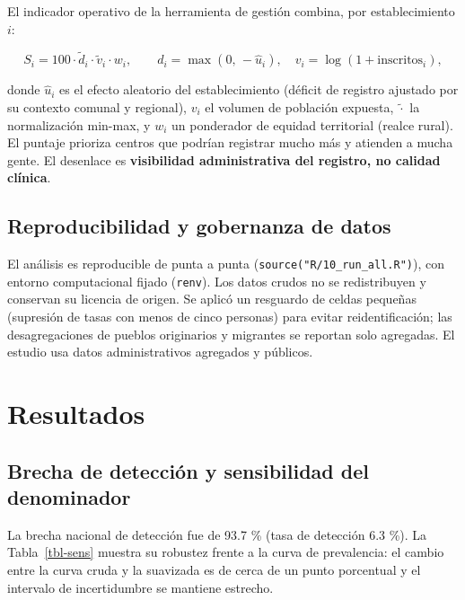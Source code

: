 \documentclass[
  spanish,
  letterpaper,
  DIV=11,
  numbers=noendperiod]{scrartcl}
\begin{document}
El indicador operativo de la herramienta de gestión combina, por
establecimiento \(i\):

\[S_i = 100 \cdot \tilde d_i \cdot \tilde v_i \cdot w_i, \qquad d_i = \max(0,\,-\hat u_i), \quad v_i = \log(1+\text{inscritos}_i),\]

donde \(\hat u_i\) es el efecto aleatorio del establecimiento (déficit
de registro ajustado por su contexto comunal y regional), \(v_i\) el
volumen de población expuesta, \(\tilde{\cdot}\) la normalización
min-max, y \(w_i\) un ponderador de equidad territorial (realce rural).
El puntaje prioriza centros que podrían registrar mucho más y atienden a
mucha gente. El desenlace es \textbf{visibilidad administrativa del
registro, no calidad clínica}.

\subsection{Reproducibilidad y gobernanza de
datos}\label{reproducibilidad-y-gobernanza-de-datos}

El análisis es reproducible de punta a punta
(\texttt{source("R/10\_run\_all.R")}), con entorno computacional fijado
(\texttt{renv}). Los datos crudos no se redistribuyen y conservan su
licencia de origen. Se aplicó un resguardo de celdas pequeñas (supresión
de tasas con menos de cinco personas) para evitar reidentificación; las
desagregaciones de pueblos originarios y migrantes se reportan solo
agregadas. El estudio usa datos administrativos agregados y públicos.

\section{Resultados}\label{resultados}

\subsection{Brecha de detección y sensibilidad del
denominador}\label{brecha-de-detecciuxf3n-y-sensibilidad-del-denominador}

La brecha nacional de detección fue de 93.7 \% (tasa de detección 6.3
\%). La Tabla~\ref{tbl-sens} muestra su robustez frente a la curva de
prevalencia: el cambio entre la curva cruda y la suavizada es de cerca
de un punto porcentual y el intervalo de incertidumbre se mantiene
estrecho.
\end{document}
